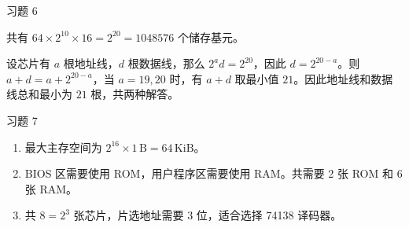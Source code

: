 \begin{problem}
    习题 6
    \begin{solution}
        共有 $64 \times 2^{10} \times 16 = 2^{20} = 1048576$ 个储存基元。

        设芯片有 $a$ 根地址线，$d$ 根数据线，那么 $2^{a} d = 2^{20}$，因此 $d = 2^{20 - a}$。则 $a + d = a + 2^{20 - a}$，当 $a = 19, 20$ 时，有 $a + d$ 取最小值 $21$。因此地址线和数据线总和最小为 $21$ 根，共两种解答。
    \end{solution}
\end{problem}

\begin{problem}
    习题 7
    \begin{solution}
        \begin{enumerate}
            \item[\textbf{1)}] 最大主存空间为 $2^{16} \times 1 \,\mathrm{B} = 64 \,\mathrm{KiB}$。
            \item[\textbf{2)}] BIOS 区需要使用 ROM，用户程序区需要使用 RAM。共需要 2 张 ROM 和 6 张 RAM。
            \item[\textbf{3)}] 共 $8 = 2^{3}$ 张芯片，片选地址需要 $3$ 位，适合选择 74138 译码器。
        \end{enumerate}
    \end{solution}
\end{problem}

